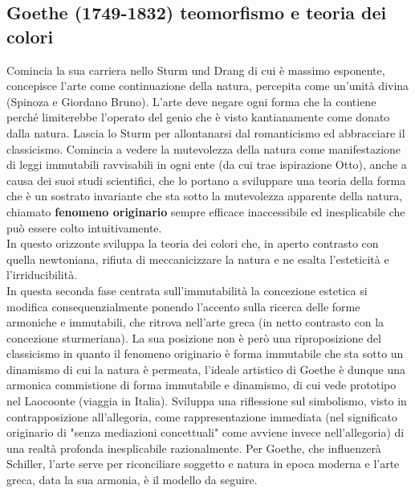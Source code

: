 \documentclass[10pt,a4paper]{article}
\begin{document}
\subsection{Goethe (1749-1832) teomorfismo e teoria dei colori}
Comincia la sua carriera nello Sturm und Drang di cui è massimo esponente, concepisce l'arte come continuazione della natura, percepita come un'unità divina (Spinoza e Giordano Bruno). L'arte deve negare ogni forma che la contiene perché limiterebbe l'operato del genio che è visto kantianamente come donato dalla natura. Lascia lo Sturm per allontanarsi dal romanticismo ed abbracciare il classicismo. Comincia a vedere la mutevolezza della natura come manifestazione di leggi immutabili ravvisabili in ogni ente (da cui trae ispirazione Otto), anche a causa dei suoi studi scientifici, che lo portano a sviluppare una teoria della forma che è un sostrato invariante che sta sotto la mutevolezza apparente della natura, chiamato \textbf{fenomeno originario} sempre efficace inaccessibile ed inesplicabile che può essere colto intuitivamente.\\
In questo orizzonte sviluppa la teoria dei colori che, in aperto contrasto con quella newtoniana, rifiuta di meccanicizzare la natura e ne esalta l'esteticità e l'irriducibilità.\\
In questa seconda fase centrata sull'immutabilità la concezione estetica si modifica consequenzialmente ponendo l'accento sulla ricerca delle forme armoniche e immutabili, che ritrova nell'arte greca (in netto contrasto con la concezione sturmeriana). La sua posizione non è però una riproposizione del classicismo in quanto il fenomeno originario è forma immutabile che sta sotto un dinamismo di cui la natura è permeata, l'ideale artistico di Goethe è dunque una armonica commistione di forma immutabile e dinamismo, di cui vede prototipo nel Laocoonte (viaggia in Italia). Sviluppa una riflessione sul simbolismo, visto in contrapposizione all'allegoria, come rappresentazione immediata (nel significato originario di "senza mediazioni concettuali" come avviene invece nell'allegoria) di una realtà profonda inesplicabile razionalmente. Per Goethe, che influenzerà Schiller, l'arte serve per riconciliare soggetto e natura in epoca moderna e l'arte greca, data la sua armonia, è il modello da seguire.
\end{document}
